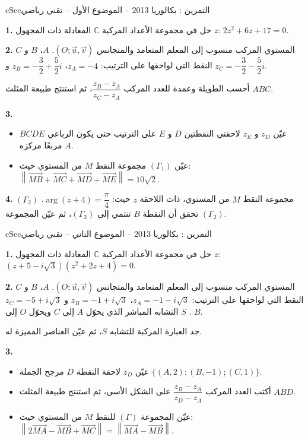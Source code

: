\documentclass[12pt,a4paper]{article}
\newenvironment{BOX}[2]{\begin{otherlanguage}{english}\begin{arbox}{#1}{#2}}{\end{arbox}\end{otherlanguage}}
\newcounter{exo}
\newenvironment{tamrin}[1]{\stepcounter{exo}\begin{BOX}{cSec}{التمرين \theexo: #1}}{\end{BOX}}
\newenvironment{sq}{\begin{itemize}[leftmargin=2.4em,itemsep=3pt]}{\end{itemize}}
\newcommand{\qa}{\item[(أ)]}\newcommand{\qb}{\item[(ب)]}\newcommand{\qc}{\item[(جـ)]}\newcommand{\qd}{\item[(د)]}\newcommand{\qe}{\item[(هـ)]}
\newcommand{\QQ}[1]{\par\smallskip\textbf{#1.} }
\begin{document}
\begin{tamrin}{بكالوريا 2013 -- الموضوع الأول -- تقني رياضي}
\QQ{1} حل في مجموعة الأعداد المركبة $\mathbb{C}$ المعادلة ذات المجهول $z$: $2z^2+6z+17=0$.
\QQ{2} المستوي المركب منسوب إلى المعلم المتعامد والمتجانس $(O;\vec u,\vec v)$.
$A$، $B$ و $C$ النقط التي لواحقها على الترتيب: $z_A=-4$، $z_B=-\dfrac32+\dfrac52 i$ و $z_C=-\dfrac32-\dfrac52 i$.

أحسب الطويلة وعمدة للعدد المركب $\dfrac{z_B-z_A}{z_C-z_A}$، ثم استنتج طبيعة المثلث $ABC$.
\QQ{3}
\begin{sq}
\qa عيّن $z_D$ و $z_E$ لاحقتي النقطتين $D$ و $E$ على الترتيب حتى يكون الرباعي $BCDE$ مربعًا مركزه $A$.
\qb عيّن $(\Gamma_1)$ مجموعة النقط $M$ من المستوي حيث: $\left\|\overrightarrow{MB}+\overrightarrow{MC}+\overrightarrow{MD}+\overrightarrow{ME}\right\|=10\sqrt2$.
\end{sq}
\QQ{4} $(\Gamma_2)$ مجموعة النقط $M$ من المستوي، ذات اللاحقة $z$ حيث: $\arg(z+4)=\dfrac{\pi}{4}$.
تحقق أن النقطة $B$ تنتمي إلى $(\Gamma_2)$، ثم عيّن المجموعة $(\Gamma_2)$.
\end{tamrin}

\begin{tamrin}{بكالوريا 2013 -- الموضوع الثاني -- تقني رياضي}
\QQ{1} حل في مجموعة الأعداد المركبة $\mathbb{C}$ المعادلة ذات المجهول $z$: $(z+5-i\sqrt3)(z^2+2z+4)=0$.
\QQ{2} المستوي المركب منسوب إلى المعلم المتعامد والمتجانس $(O;\vec u,\vec v)$.
$A$، $B$ و $C$ النقط التي لواحقها على الترتيب: $z_A=-1-i\sqrt3$، $z_B=-1+i\sqrt3$ و $z_C=-5+i\sqrt3$.
$S$ التشابه المباشر الذي يحوّل $A$ إلى $C$ ويحوّل $O$ إلى $B$.

جد العبارة المركبة للتشابه $S$، ثم عيّن العناصر المميزة له.
\QQ{3}
\begin{sq}
\qa عيّن $z_D$ لاحقة النقطة $D$ مرجح الجملة $\{(A,2);(B,-1);(C,1)\}$.
\qb أكتب العدد المركب $\dfrac{z_B-z_A}{z_D-z_A}$ على الشكل الأسي، ثم استنتج طبيعة المثلث $ABD$.
\qc عيّن المجموعة $(\Gamma)$ للنقط $M$ من المستوي حيث: $\left\|2\overrightarrow{MA}-\overrightarrow{MB}+\overrightarrow{MC}\right\|=\left\|\overrightarrow{MA}-\overrightarrow{MB}\right\|$.
\end{sq}
\end{tamrin}
\end{document}
